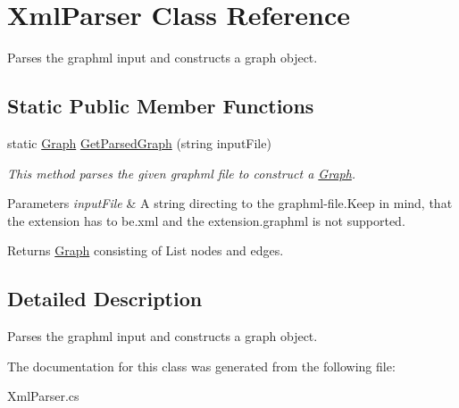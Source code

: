 \hypertarget{class_xml_parser}{}\section{Xml\+Parser Class Reference}
\label{class_xml_parser}


Parses the graphml input and constructs a graph object.  


\subsection*{Static Public Member Functions}
\begin{DoxyCompactItemize}
\item 
\mbox{\label{class_xml_parser_ae8f169d407e7e3fbe866fdff38dc47c1}} 
static \mbox{\hyperlink{class_graph}{Graph}} \mbox{\hyperlink{class_xml_parser_ae8f169d407e7e3fbe866fdff38dc47c1}{Get\+Parsed\+Graph}} (string input\+File)
\begin{DoxyCompactList}\small\item\em This method parses the given graphml file to construct a \mbox{\hyperlink{class_graph}{Graph}}. 
\begin{DoxyParams}{Parameters}
{\em input\+File} & A string directing to the graphml-\/file.\+Keep in mind, that the extension has to be.\+xml and the extension.\+graphml is not supported.\\
\hline
\end{DoxyParams}
\begin{DoxyReturn}{Returns}
\mbox{\hyperlink{class_graph}{Graph}} consisting of List nodes and edges.
\end{DoxyReturn}
\end{DoxyCompactList}\end{DoxyCompactItemize}


\subsection{Detailed Description}
Parses the graphml input and constructs a graph object. 



The documentation for this class was generated from the following file\+:\begin{DoxyCompactItemize}
\item 
Xml\+Parser.\+cs\end{DoxyCompactItemize}

